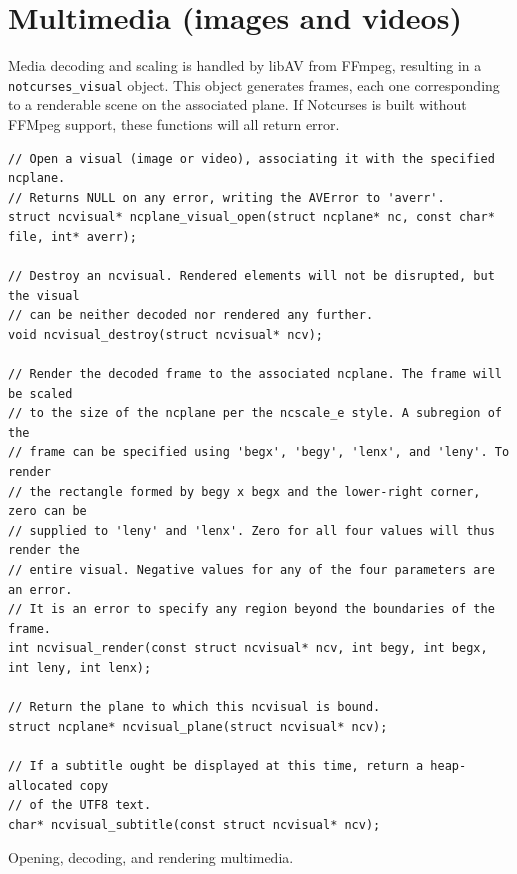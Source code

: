 \documentclass[letterpaper,10pt]{article}
\begin{document}
\section{Multimedia (images and videos)}
\label{sec:libav}

Media decoding and scaling is handled by libAV from FFmpeg, resulting in a
\texttt{notcurses\_visual} object. This object generates frames, each one
corresponding to a renderable scene on the associated plane. If Notcurses
is built without FFMpeg support, these functions will all return error.

\begin{listing}[!htbp]
\begin{verbatim}
// Open a visual (image or video), associating it with the specified ncplane.
// Returns NULL on any error, writing the AVError to 'averr'.
struct ncvisual* ncplane_visual_open(struct ncplane* nc, const char* file, int* averr);

// Destroy an ncvisual. Rendered elements will not be disrupted, but the visual
// can be neither decoded nor rendered any further.
void ncvisual_destroy(struct ncvisual* ncv);

// Render the decoded frame to the associated ncplane. The frame will be scaled
// to the size of the ncplane per the ncscale_e style. A subregion of the
// frame can be specified using 'begx', 'begy', 'lenx', and 'leny'. To render
// the rectangle formed by begy x begx and the lower-right corner, zero can be
// supplied to 'leny' and 'lenx'. Zero for all four values will thus render the
// entire visual. Negative values for any of the four parameters are an error.
// It is an error to specify any region beyond the boundaries of the frame.
int ncvisual_render(const struct ncvisual* ncv, int begy, int begx, int leny, int lenx);

// Return the plane to which this ncvisual is bound.
struct ncplane* ncvisual_plane(struct ncvisual* ncv);

// If a subtitle ought be displayed at this time, return a heap-allocated copy
// of the UTF8 text.
char* ncvisual_subtitle(const struct ncvisual* ncv);
\end{verbatim}
\caption{Opening, decoding, and rendering multimedia.}
\label{list:multimedia}
\end{listing}
\end{document}
